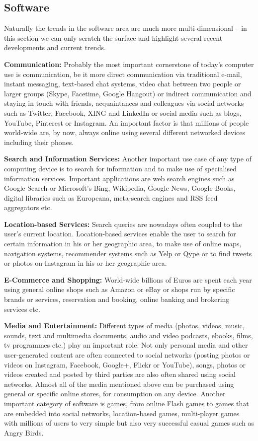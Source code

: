 \documentclass[10pt, plain]{../../metanetpaper}
\begin{document}
\begin{multicols}{2}

\subsection{Software}
\label{sec:software}

Naturally the trends in the software area are much more multi-dimensional -- in this section we can only scratch the surface and highlight several recent developments and current trends.

\textbf{Communication:} Probably the most important cornerstone of today's computer use is communication, be it more direct communication via traditional e-mail, instant messaging, text-based chat systems, video chat between two people or larger groups (Skype, Facetime, Google Hangout) or indirect communication and staying in touch with friends, acquaintances and colleagues via social networks such as Twitter, Facebook, XING and LinkedIn or social media such as blogs, YouTube, Pinterest or Instagram. An important factor is that millions of people world-wide are, by now, always online using several different networked devices including their phones.

\textbf{Search and Information Services:} Another important use case of any type of computing device is to search for information and to make use of specialised information services. Important applications are web search engines such as Google Search or Microsoft's Bing, Wikipedia, Google News, Google Books, digital libraries such as Europeana, meta-search engines and RSS feed aggregators etc.

\textbf{Location-based Services:} Search queries are nowadays often coupled to the user's current location. Location-based services enable the user to search for certain information in his or her geographic area, to make use of online maps, navigation systems, recommender systems such as Yelp or Qype or to find tweets or photos on Instagram in his or her geographic area.

\textbf{E-Commerce and Shopping:} World-wide billions of Euros are spent each year using general online shops such as Amazon or eBay or shops run by specific brands or services, reservation and booking, online banking and brokering services etc. 

\textbf{Media and Entertainment:} Different types of media (photos, videos, music, sounds, text and multimedia documents, audio and video podcasts, ebooks, films, tv programmes etc.) play an important role. Not only personal media and other user-generated content are often connected to social networks (posting photos or videos on Instagram, Facebook, Google+, Flickr or YouTube), songs, photos or videos created and posted by third parties are also often shared using social networks. Almost all of the media mentioned above can be purchased using general or specific online stores, for consumption on any device. Another important category of software is games, from online Flash games to games that are embedded into social networks, location-based games, multi-player games with millions of users to very simple but also very successful casual games such as Angry Birds.


\end{multicols}
\end{document}
